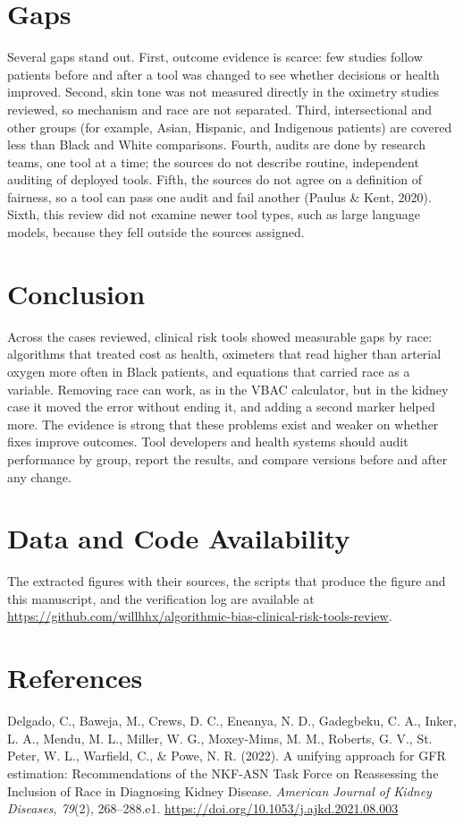 \documentclass[12pt]{article}
\begin{document}
\section*{Gaps}
Several gaps stand out. First, outcome evidence is scarce: few studies follow patients before and after a tool was changed to see whether decisions or health improved. Second, skin tone was not measured directly in the oximetry studies reviewed, so mechanism and race are not separated. Third, intersectional and other groups (for example, Asian, Hispanic, and Indigenous patients) are covered less than Black and White comparisons. Fourth, audits are done by research teams, one tool at a time; the sources do not describe routine, independent auditing of deployed tools. Fifth, the sources do not agree on a definition of fairness, so a tool can pass one audit and fail another (Paulus \& Kent, 2020). Sixth, this review did not examine newer tool types, such as large language models, because they fell outside the sources assigned.

\section*{Conclusion}
Across the cases reviewed, clinical risk tools showed measurable gaps by race: algorithms that treated cost as health, oximeters that read higher than arterial oxygen more often in Black patients, and equations that carried race as a variable. Removing race can work, as in the VBAC calculator, but in the kidney case it moved the error without ending it, and adding a second marker helped more. The evidence is strong that these problems exist and weaker on whether fixes improve outcomes. Tool developers and health systems should audit performance by group, report the results, and compare versions before and after any change.

\section*{Data and Code Availability}
{\raggedright The extracted figures with their sources, the scripts that produce the figure and this manuscript, and the verification log are available at \url{https://github.com/willhhx/algorithmic-bias-clinical-risk-tools-review}.\par}

\section*{References}
\begingroup\small\setlength{\parindent}{-0.5in}\setlength{\leftskip}{0.5in}\setlength{\parskip}{4pt}
Delgado, C., Baweja, M., Crews, D. C., Eneanya, N. D., Gadegbeku, C. A., Inker, L. A., Mendu, M. L., Miller, W. G., Moxey-Mims, M. M., Roberts, G. V., St. Peter, W. L., Warfield, C., \& Powe, N. R. (2022). A unifying approach for GFR estimation: Recommendations of the NKF-ASN Task Force on Reassessing the Inclusion of Race in Diagnosing Kidney Disease. \emph{American Journal of Kidney Diseases, 79}(2), 268--288.e1. \url{https://doi.org/10.1053/j.ajkd.2021.08.003}
\end{document}
